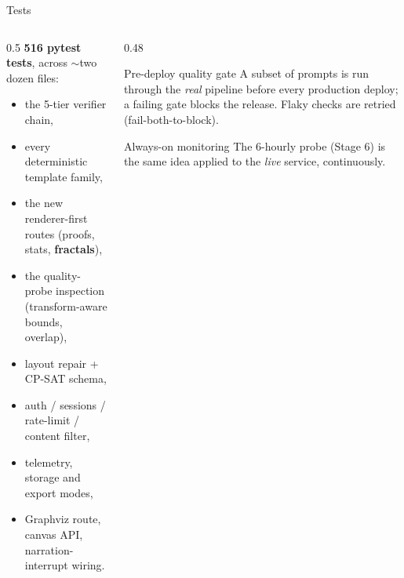 \documentclass[aspectratio=169,11pt]{beamer}
\begin{document}
\begin{frame}{Tests}
  \begin{columns}[T]
  \begin{column}{0.5\textwidth}
  \textbf{516 pytest tests}, across $\sim$two dozen files:
  \begin{itemize}\footnotesize
    \item the 5-tier verifier chain,
    \item every deterministic template family,
    \item the new renderer-first routes (proofs, stats, \textbf{fractals}),
    \item the quality-probe inspection (transform-aware bounds, overlap),
    \item layout repair + CP-SAT schema,
    \item auth / sessions / rate-limit / content filter,
    \item telemetry, storage and export modes,
    \item Graphviz route, canvas API, narration-interrupt wiring.
  \end{itemize}
  \end{column}
  \begin{column}{0.48\textwidth}
    \begin{block}{Pre-deploy quality gate}
    \footnotesize A subset of prompts is run through the \emph{real}
    pipeline before every production deploy; a failing gate blocks the
    release. Flaky checks are retried (fail-both-to-block).
    \end{block}
    \begin{block}{Always-on monitoring}
    \footnotesize The 6-hourly probe (Stage 6) is the same idea applied to
    the \emph{live} service, continuously.
    \end{block}
  \end{column}
  \end{columns}
\end{frame}
\end{document}
